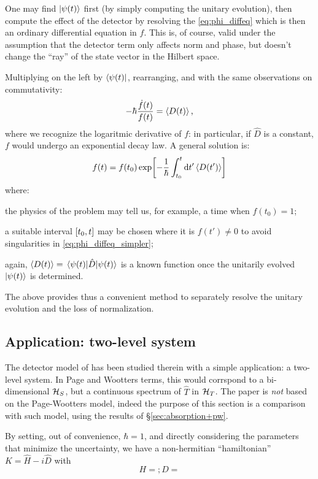 One may find $\ket{\psi(t)}$ first (by simply computing the unitary evolution),
then compute the effect of the detector by resolving the \eqref{eq:phi_diffeq}
which is then an ordinary differential equation in $f$. This is, of course, valid
under the assumption that the detector term only affects norm and phase,
but doesn't change the ``ray'' of the state vector in the Hilbert space. 

Multiplying on the left by $\bra{\psi(t)}$, rearranging, and with the same observations
on commutativity:
\begin{equation}\label{eq:phi_diffeq_simpler}
  -\hbar\frac{\dot{f}(t)}{f(t)} = \ev{D(t)} \text{,}
\end{equation}
where we recognize the logaritmic derivative of $f$: in particular,
if $\hat{D}$ is a constant, $f$ would undergo an exponential decay law.
A general solution is:
\begin{equation}\label{eq:f-evol}
  f(t) = f(t_0) \exp[ -\frac{1}{\hbar} \int_{t_0}^{t} \dd{t'} \ev{D(t')} ]
\end{equation}
where:
\begin{enumerate*}[label=\emph{\alph*})]
  \item
    the physics of the problem may tell us, for example, a time when $f(t_0) = 1$;
  \item
    a suitable interval $\qty[t_0, t]$ may be chosen where it is $f(t') \ne 0$
    to avoid singularities in \eqref{eq:phi_diffeq_simpler};
  \item
    again, $\ev{D(t)} = \mel{\psi(t)}{\hat{D}}{\psi(t)}$ is a known function
    once the unitarily evolved $\ket{\psi(t)}$ is determined.
\end{enumerate*}

The above provides thus a convenient method to separately resolve
the unitary evolution and the loss of normalization.

\subsection{Application: two-level system}

The detector model of \cite{RuschhauptAbsorption} has been studied therein
with a simple application: a two-level system. In Page and Wootters terms,
this would corrspond to a bi-dimensional $\mathcal{H}_S$, but a continuous
spectrum of $\hat{T}$ in $\mathcal{H}_T$. The paper is \emph{not} based on
the Page-Wootters model, indeed the purpose of this section is a comparison
with such model, using the results of \S \ref{sec:absorption+pw}.

By setting, out of convenience, $\hbar = 1$, and directly considering the parameters
that minimize the uncertainty, we have a non-hermitian ``hamiltonian''
$K = \hat{H} - i\hat{D}$ with
\begin{equation}
  H = ; D =
\end{equation}